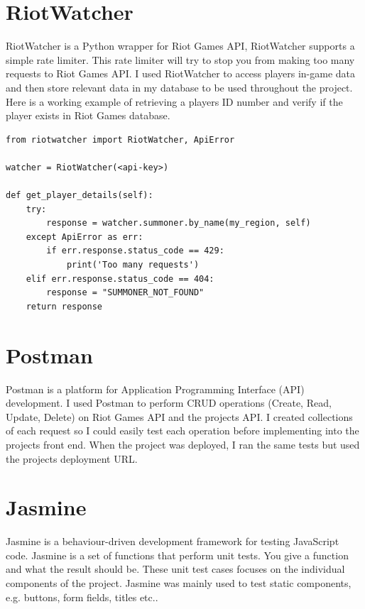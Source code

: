 \section{RiotWatcher}
RiotWatcher is a Python wrapper for Riot Games API, RiotWatcher supports a simple rate limiter. This \cite{dealcisco} rate limiter will try to stop you from making too many requests to Riot Games API. I used RiotWatcher to access players in-game data and then store relevant data in my database to be used throughout the project. Here is a working example of retrieving a players ID number and verify if the player exists in Riot Games database.
\begin{verbatim}
from riotwatcher import RiotWatcher, ApiError

watcher = RiotWatcher(<api-key>)

def get_player_details(self):
	try:
		response = watcher.summoner.by_name(my_region, self)
	except ApiError as err:
		if err.response.status_code == 429:
			print('Too many requests')
	elif err.response.status_code == 404:
		response = "SUMMONER_NOT_FOUND"
	return response
\end{verbatim}
\newpage
\section{Postman}
Postman \cite{postman} is a platform for Application Programming Interface (API) development. I used Postman to perform CRUD operations (Create, Read, Update, Delete) on Riot Games API and the projects API. I created collections of each request so I could easily test each operation before implementing into the projects front end. When the project was deployed, I ran the same tests but used the projects deployment URL.
\section{Jasmine}
Jasmine \cite{jasmine} is a behaviour-driven development framework for testing JavaScript code. Jasmine is a set of functions that perform unit tests. You give a function and what the result should be. These unit test cases \cite{elbaum2006carving} focuses on the individual components of the project. Jasmine was mainly used to test static components, e.g. buttons, form fields, titles etc..
